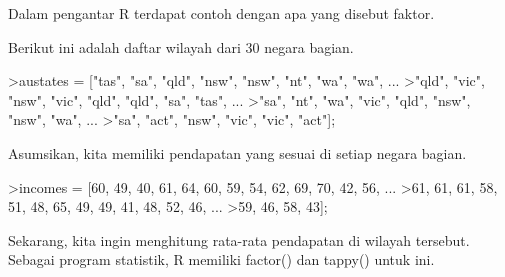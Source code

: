 \documentclass[a4paper,10pt]{article}
\begin{document}
\begin{eulernotebook}
\begin{eulercomment}
\begin{eulercomment}
\begin{eulercomment}
\begin{eulercomment}
\begin{eulercomment}
\begin{eulercomment}
\begin{eulercomment}
\begin{eulercomment}
\begin{eulercomment}
\begin{eulercomment}
\begin{eulercomment}
\begin{eulercomment}
\begin{eulercomment}
\begin{eulercomment}
\begin{eulercomment}
\begin{eulercomment}
\begin{eulercomment}
\begin{eulercomment}
\begin{eulercomment}
\begin{eulercomment}
\begin{eulercomment}
\begin{eulercomment}
\begin{eulercomment}
\begin{eulercomment}
\begin{eulercomment}
\begin{eulercomment}
\begin{eulercomment}
\begin{eulercomment}
\begin{eulercomment}
\begin{eulercomment}
\begin{eulercomment}
\begin{eulercomment}
\begin{eulercomment}
\begin{eulercomment}
\begin{eulercomment}
Dalam pengantar R terdapat contoh dengan apa yang disebut faktor.

Berikut ini adalah daftar wilayah dari 30 negara bagian.
\end{eulercomment}
\begin{eulerprompt}
>austates = ["tas", "sa", "qld", "nsw", "nsw", "nt", "wa", "wa", ...
>"qld", "vic", "nsw", "vic", "qld", "qld", "sa", "tas", ...
>"sa", "nt", "wa", "vic", "qld", "nsw", "nsw", "wa", ...
>"sa", "act", "nsw", "vic", "vic", "act"];
\end{eulerprompt}
\begin{eulercomment}
Asumsikan, kita memiliki pendapatan yang sesuai di setiap negara
bagian.
\end{eulercomment}
\begin{eulerprompt}
>incomes = [60, 49, 40, 61, 64, 60, 59, 54, 62, 69, 70, 42, 56, ...
>61, 61, 61, 58, 51, 48, 65, 49, 49, 41, 48, 52, 46, ...
>59, 46, 58, 43];
\end{eulerprompt}
\begin{eulercomment}
Sekarang, kita ingin menghitung rata-rata pendapatan di wilayah
tersebut. Sebagai program statistik, R memiliki factor() dan tappy()
untuk ini.


\end{eulercomment}
\end{eulercomment}
\end{eulercomment}
\end{eulercomment}
\end{eulercomment}
\end{eulercomment}
\end{eulercomment}
\end{eulercomment}
\end{eulercomment}
\end{eulercomment}
\end{eulercomment}
\end{eulercomment}
\end{eulercomment}
\end{eulercomment}
\end{eulercomment}
\end{eulercomment}
\end{eulercomment}
\end{eulercomment}
\end{eulercomment}
\end{eulercomment}
\end{eulercomment}
\end{eulercomment}
\end{eulercomment}
\end{eulercomment}
\end{eulercomment}
\end{eulercomment}
\end{eulercomment}
\end{eulercomment}
\end{eulercomment}
\end{eulercomment}
\end{eulercomment}
\end{eulercomment}
\end{eulercomment}
\end{eulercomment}
\end{eulercomment}
\end{eulernotebook}
\end{document}
